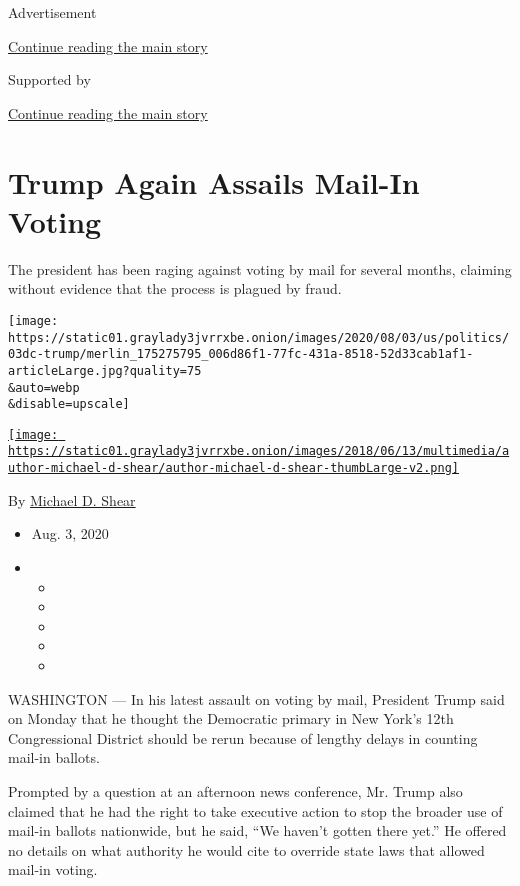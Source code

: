 Advertisement

\protect\hyperlink{after-top}{Continue reading the main story}

Supported by

\protect\hyperlink{after-sponsor}{Continue reading the main story}

\hypertarget{trump-again-assails-mail-in-voting}{%
\section{Trump Again Assails Mail-In
Voting}\label{trump-again-assails-mail-in-voting}}

The president has been raging against voting by mail for several months,
claiming without evidence that the process is plagued by fraud.

\texttt{[image: https://static01.graylady3jvrrxbe.onion/images/2020/08/03/us/politics/03dc-trump/merlin\_175275795\_006d86f1-77fc-431a-8518-52d33cab1af1-articleLarge.jpg?quality=75\\\&auto=webp\\\&disable=upscale]}

\href{https://www.nytimes3xbfgragh.onion/by/michael-d-shear}{\texttt{[image: https://static01.graylady3jvrrxbe.onion/images/2018/06/13/multimedia/author-michael-d-shear/author-michael-d-shear-thumbLarge-v2.png]}}

By \href{https://www.nytimes3xbfgragh.onion/by/michael-d-shear}{Michael
D. Shear}

\begin{itemize}
\item
  Aug. 3, 2020
\item
  \begin{itemize}
  \item
  \item
  \item
  \item
  \item
  \end{itemize}
\end{itemize}

WASHINGTON --- In his latest assault on voting by mail, President Trump
said on Monday that he thought the Democratic primary in New York's 12th
Congressional District should be rerun because of lengthy delays in
counting mail-in ballots.

Prompted by a question at an afternoon news conference, Mr. Trump also
claimed that he had the right to take executive action to stop the
broader use of mail-in ballots nationwide, but he said, ``We haven't
gotten there yet.'' He offered no details on what authority he would
cite to override state laws that allowed mail-in voting.

